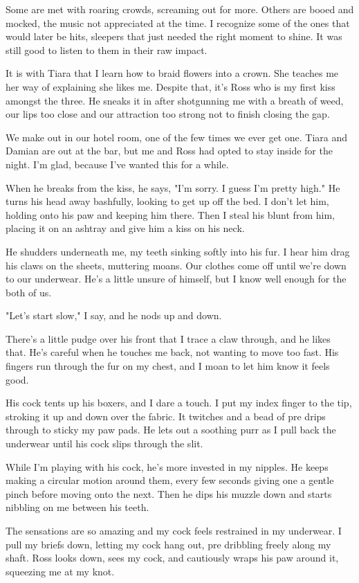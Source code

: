 Some are met with roaring crowds, screaming out for more. Others are booed and mocked, the music not appreciated at the time. I recognize some of the ones that would later be hits, sleepers that just needed the right moment to shine. It was still good to listen to them in their raw impact.

It is with Tiara that I learn how to braid flowers into a crown. She teaches me her way of explaining she likes me. Despite that, it's Ross who is my first kiss amongst the three. He sneaks it in after shotgunning me with a breath of weed, our lips too close and our attraction too strong not to finish closing the gap.

We make out in our hotel room, one of the few times we ever get one. Tiara and Damian are out at the bar, but me and Ross had opted to stay inside for the night. I'm glad, because I've wanted this for a while.

When he breaks from the kiss, he says, "I'm sorry. I guess I'm pretty high." He turns his head away bashfully, looking to get up off the bed. I don't let him, holding onto his paw and keeping him there. Then I steal his blunt from him, placing it on an ashtray and give him a kiss on his neck.

He shudders underneath me, my teeth sinking softly into his fur. I hear him drag his claws on the sheets, muttering moans. Our clothes come off until we're down to our underwear. He's a little unsure of himself, but I know well enough for the both of us.

"Let's start slow," I say, and he nods up and down.

There's a little pudge over his front that I trace a claw through, and he likes that. He's careful when he touches me back, not wanting to move too fast. His fingers run through the fur on my chest, and I moan to let him know it feels good.

His cock tents up his boxers, and I dare a touch. I put my index finger to the tip, stroking it up and down over the fabric. It twitches and a bead of pre drips through to sticky my paw pads. He lets out a soothing purr as I pull back the underwear until his cock slips through the slit.

While I'm playing with his cock, he's more invested in my nipples. He keeps making a circular motion around them, every few seconds giving one a gentle pinch before moving onto the next. Then he dips his muzzle down and starts nibbling on me between his teeth.

The sensations are so amazing and my cock feels restrained in my underwear. I pull my briefs down, letting my cock hang out, pre dribbling freely along my shaft. Ross looks down, sees my cock, and cautiously wraps his paw around it, squeezing me at my knot.

